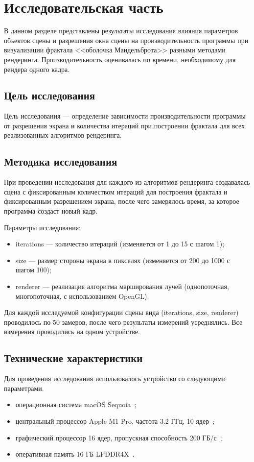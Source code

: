 \section{Исследовательская часть}
В данном разделе представлены результаты исследования влияния параметров объектов сцены
и разрешения окна сцены на производительность
программы при визуализации фрактала <<оболочка Мандельброта>> разными методами рендеринга.
Производительность оценивалась по времени, необходимому для рендера одного кадра.

\subsection{Цель исследования}
Цель исследования --- определение зависимости производительности программы от
разрешения экрана и количества итераций при построении фрактала для всех реализованных
алгоритмов рендеринга.

\subsection{Методика исследования}
При проведении исследования для каждого из алгоритмов рендеринга создавалась сцена
с фиксированным количеством итераций для построения фрактала и фиксированным разрешением экрана,
после чего замерялось время, за которое программа создаст новый кадр.

Параметры исследования:
\begin{itemize}
  \item iterations --- количество итераций (изменяется от 1 до 15 с шагом 1);
  \item size --- размер стороны экрана в пикселях (изменяется от 200 до 1000 с шагом 100);
  \item renderer --- реализация алгоритма марширования лучей (однопоточная, многопоточная, с использованием OpenGL).
\end{itemize}

Для каждой исследуемой конфигурации сцены вида (iterations, size, renderer) проводилось
по 50 замеров, после чего результаты измерений усреднялись. Все измерения проводились на
одном устройстве.

\subsection{Технические характеристики}
Для проведения исследования использовалось устройство со следующими параметрами.

\begin{itemize}
  \item операционная система macOS Sequoia~\cite{macos};
  \item центральный процессор Apple M1 Pro, частота 3.2 ГГц, 10 ядер~\cite{macbook};
  \item графический процессор 16 ядер, пропускная способность 200 ГБ/с~\cite{macbook};
  \item оперативная память 16 ГБ LPDDR4X~\cite{macbook}.
\end{itemize}

